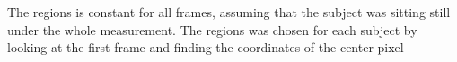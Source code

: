 The regions is constant for all frames, assuming that the subject was sitting still under the whole measurement. The regions was chosen for each subject by looking at the first frame and finding the coordinates of the center pixel

